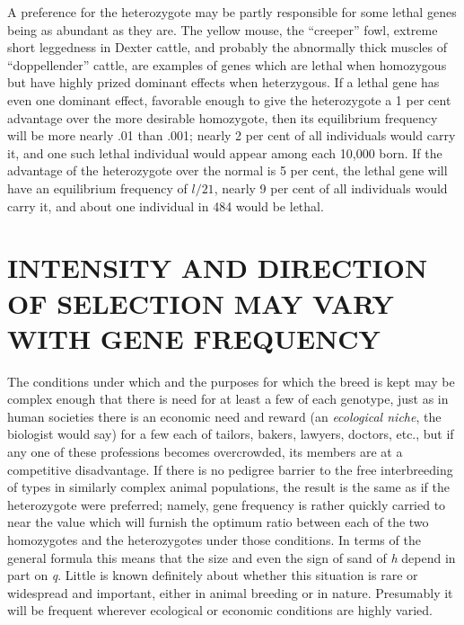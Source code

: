 A preference for the heterozygote may be partly responsible for some lethal genes
being as abundant as they are. The yellow mouse, the ``creeper'' fowl, extreme short
leggedness in Dexter cattle, and probably the abnormally thick muscles of ``doppellender''
cattle, are examples of genes which are lethal when homozygous but have highly prized
dominant effects when heterzygous. If a lethal gene has even one dominant effect,
favorable enough to give the heterozygote a 1 per cent advantage over the more desirable
homozygote, then its equilibrium frequency will be more nearly .01 than .001; nearly 2 per
cent of all individuals would carry it, and one such lethal individual would appear among
each 10,000 born. If the advantage of the heterozygote over the normal is 5 per cent, the
lethal gene will have an equilibrium frequency of $l/21$, nearly 9 per cent of all individuals
would carry it, and about one individual in 484 would be lethal.

\section*{INTENSITY AND DIRECTION OF SELECTION MAY VARY WITH GENE FREQUENCY}

The conditions under which and the purposes for which the breed is kept may be complex
enough that there is need for at least a few of each genotype, just as in human societies
there is an economic need and reward (an \textit{ecological niche}, the biologist would
say) for a few each of tailors, bakers, lawyers, doctors, etc., but if any
one of these professions becomes overcrowded, its members are at a
competitive disadvantage. If there is no pedigree barrier to the free
interbreeding of types in similarly complex animal populations, the
result is the same as if the heterozygote were preferred; namely, gene
frequency is rather quickly carried to near the value which will furnish
the optimum ratio between each of the two homozygotes and the heterozygotes
under those conditions. In terms of the general formula this
means that the size and even the sign of sand of \textit{h} depend in part on
\textit{q}. Little is known definitely about whether this situation is rare or
widespread and important, either in animal breeding or in nature. Presumably
it will be frequent wherever ecological or economic conditions are highly varied.

